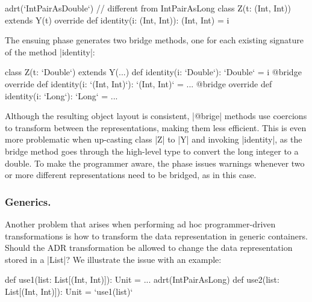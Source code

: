 \begin{lstlisting-nobreak}
adrt(`IntPairAsDouble`) { // different from IntPairAsLong
  class Z(t: (Int, Int)) extends Y(t) {
    override def identity(i: (Int, Int)): (Int, Int) = i
  }
}
\end{lstlisting-nobreak}

The ensuing \bridge{} phase generates two bridge methods, one for each existing signature of the method |identity|:

\begin{lstlisting-nobreak}
class Z(t: `Double`) extends Y(...) {
  def identity(i: `Double`): `Double` = i
  @bridge override def identity(i: `(Int, Int)`): `(Int, Int)` = ...
  @bridge override def identity(i: `Long`): `Long` = ...
}
\end{lstlisting-nobreak}


Although the resulting object layout is consistent, |@brige| methods use coercions to transform between the representations, making them less efficient. This is even more problematic when up-casting class |Z| to |Y| and invoking |identity|, as the bridge method goes through the high-level type to convert the long integer to a double. To make the programmer aware, the \bridge{} phase issues warnings whenever two or more different representations need to be bridged, as in this case.

\subsubsection{Generics.}
Another problem that arises when performing ad hoc programmer-driven transformations is how to transform the data representation in generic containers. Should the ADR transformation be allowed to change the data representation stored in a |List|? We illustrate the issue with an example:

\begin{lstlisting-nobreak}
def use1(list: List[(Int, Int)]): Unit = ...
adrt(IntPairAsLong) {
  def use2(list: List[(Int, Int)]): Unit = `use1(list)`
}
\end{lstlisting-nobreak}

